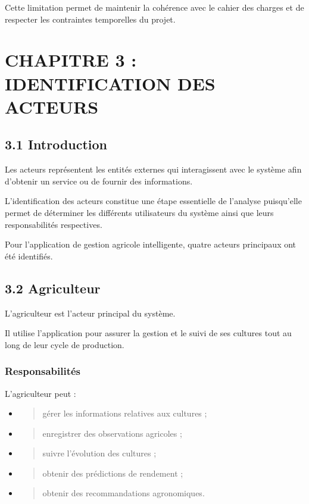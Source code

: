 \documentclass[
]{book}
\begin{document}
Cette limitation permet de maintenir la cohérence avec le cahier des
charges et de respecter les contraintes temporelles du projet.

\hypertarget{chapitre-3-identification-des-acteurs}{%
\chapter{CHAPITRE 3 : IDENTIFICATION DES
ACTEURS}\label{chapitre-3-identification-des-acteurs}}

\hypertarget{introduction}{%
\section{3.1 Introduction}\label{introduction}}

Les acteurs représentent les entités externes qui interagissent avec le
système afin d'obtenir un service ou de fournir des informations.

L'identification des acteurs constitue une étape essentielle de
l'analyse puisqu'elle permet de déterminer les différents utilisateurs
du système ainsi que leurs responsabilités respectives.

Pour l'application de gestion agricole intelligente, quatre acteurs
principaux ont été identifiés.

\hypertarget{agriculteur}{%
\section{3.2 Agriculteur}\label{agriculteur}}

L'agriculteur est l'acteur principal du système.

Il utilise l'application pour assurer la gestion et le suivi de ses
cultures tout au long de leur cycle de production.

\hypertarget{responsabilituxe9s}{%
\subsection{Responsabilités}\label{responsabilituxe9s}}

L'agriculteur peut :

\begin{itemize}
\item
  \begin{quote}
  gérer les informations relatives aux cultures ;
  \end{quote}
\item
  \begin{quote}
  enregistrer des observations agricoles ;
  \end{quote}
\item
  \begin{quote}
  suivre l'évolution des cultures ;
  \end{quote}
\item
  \begin{quote}
  obtenir des prédictions de rendement ;
  \end{quote}
\item
  \begin{quote}
  obtenir des recommandations agronomiques.
  \end{quote}
\end{itemize}
\end{document}
